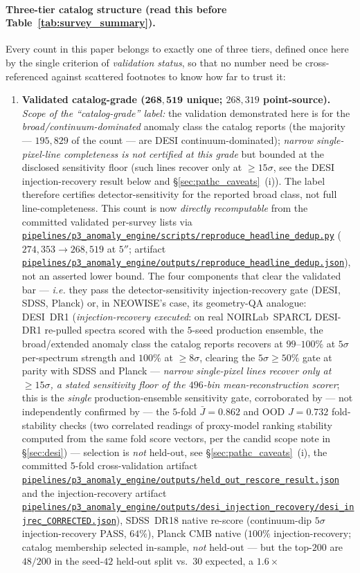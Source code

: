 \documentclass[aps,prd,twocolumn,superscriptaddress,showpacs,preprintnumbers,nofootinbib,longbibliography,floatfix]{revtex4-2}
\newcommand{\repoBase}{https://github.com/Hubify-Projects/bigbounce/blob/main}
\newcommand{\artifact}[1]{\href{\repoBase/#1}{\nolinkurl{#1}}}
\begin{document}
\paragraph*{Three-tier catalog structure (read this before Table~\ref{tab:survey_summary}).} Every count in this paper belongs to exactly one of three tiers, defined once here by the single criterion of \emph{validation status}, so that no number need be cross-referenced against scattered footnotes to know how far to trust it:
\begin{enumerate}[leftmargin=1.4em,topsep=2pt,itemsep=1pt]
\item \textbf{Validated catalog-grade ($\mathbf{268{,}519}$ unique; $268{,}319$ point-source).} \emph{Scope of the ``catalog-grade'' label:} the validation demonstrated here is for the \emph{broad/continuum-dominated} anomaly class the catalog reports (the majority --- $195{,}829$ of the count --- are DESI continuum-dominated); \emph{narrow single-pixel-line completeness is not certified at this grade} but bounded at the disclosed sensitivity floor (such lines recover only at $\geq\!15\sigma$, see the DESI injection-recovery result below and \S\ref{sec:pathc_caveats}~(i)). The label therefore certifies detector-sensitivity for the reported broad class, not full line-completeness. This count is now \emph{directly recomputable} from the committed validated per-survey lists via \artifact{pipelines/p3\_anomaly\_engine/scripts/reproduce\_headline\_dedup.py} ($274{,}353 \to 268{,}519$ at $5''$; artifact \artifact{pipelines/p3\_anomaly\_engine/outputs/reproduce\_headline\_dedup.json}), not an asserted lower bound. The four components that clear the validated bar --- \emph{i.e.} they pass the detector-sensitivity injection-recovery gate (DESI, SDSS, Planck) or, in NEOWISE's case, its geometry-QA analogue: DESI~DR1 (\emph{injection-recovery executed}: on real NOIRLab~SPARCL DESI-DR1 re-pulled spectra scored with the $5$-seed production ensemble, the broad/extended anomaly class the catalog reports recovers at $99$--$100\%$ at $5\sigma$ per-spectrum strength and $100\%$ at $\geq\!8\sigma$, clearing the $5\sigma\geq50\%$ gate at parity with SDSS and Planck --- \emph{narrow single-pixel lines recover only at $\geq\!15\sigma$, a stated sensitivity floor of the $496$-bin mean-reconstruction scorer}; this is the \emph{single} production-ensemble sensitivity gate, corroborated by --- not independently confirmed by --- the $5$-fold $\bar J = 0.862$ and OOD $J = 0.732$ fold-stability checks (two correlated readings of proxy-model ranking stability computed from the same fold score vectors, per the candid scope note in \S\ref{sec:desi}) --- selection is \emph{not} held-out, see \S\ref{sec:pathc_caveats}~(i), the committed 5-fold cross-validation artifact \artifact{pipelines/p3\_anomaly\_engine/outputs/held\_out\_rescore\_result.json} and the injection-recovery artifact \artifact{pipelines/p3\_anomaly\_engine/outputs/desi\_injection\_recovery/desi\_injrec\_CORRECTED.json}), SDSS~DR18 native re-score (continuum-dip $5\sigma$ injection-recovery PASS, $64\%$), Planck CMB native ($100\%$ injection-recovery; catalog membership selected in-sample, \emph{not} held-out --- but the top-$200$ are $48/200$ in the seed-$42$ held-out split vs.\ $30$ expected, a $1.6\times$ 
\end{enumerate}
\end{document}
